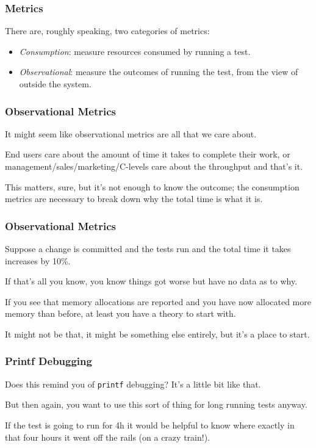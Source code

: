 \begin{frame}
\frametitle{Metrics}

There are, roughly speaking, two categories of metrics:

\begin{itemize}
	\item \textit{Consumption}: measure resources consumed by running a test.
	\item \textit{Observational}: measure the outcomes of running the test, from the view of outside the system.
\end{itemize}


\end{frame}




\begin{frame}
\frametitle{Observational Metrics}

It might seem like observational metrics are all that we care about. 

End users care about the amount of time it takes to complete their work, or management/sales/marketing/C-levels care about the throughput and that's it. 

This matters, sure, but it's not enough to know the outcome; the consumption metrics are necessary to break down why the total time is what it is.

\end{frame}



\begin{frame}
\frametitle{Observational Metrics}

Suppose a change is committed and the tests run and the total time it takes increases by 10\%. 

If that's all you know, you know things got worse but have no data as to why. 

If you see that memory allocations are reported and you have now allocated more memory than before,  at least you have a theory to start with.

It might not be that, it might be something else entirely, but it's a place to start. 

\end{frame}



\begin{frame}
\frametitle{Printf Debugging}

Does this remind you of \texttt{printf} debugging? It's a little bit like that. 

But then again, you want to use this sort of thing for long running tests anyway. 

If the test is going to run for 4h it would be helpful to know where exactly in that four hours it went off the rails (on a crazy train!). 

\end{frame}



